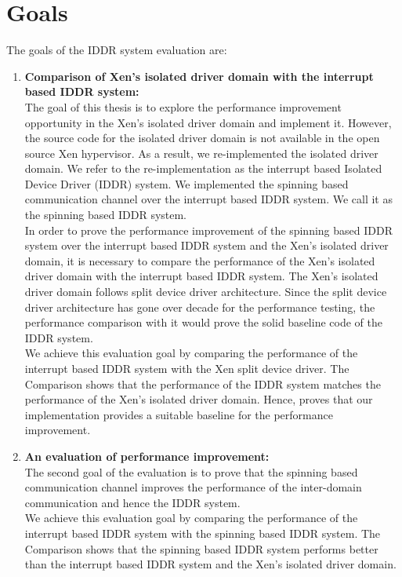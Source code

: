 \section{Goals}
\label{sec:goals}
The goals of the IDDR system evaluation are:
\begin{enumerate}
\item \textbf{Comparison  of Xen's isolated driver domain with the interrupt based IDDR system:}
\\[3mm]
The goal of this thesis is to explore the performance improvement opportunity in the Xen's isolated driver domain and implement it. However, the source code for the isolated driver domain is not available in the open source Xen hypervisor. As a result, we re-implemented the isolated driver domain. We refer to the re-implementation as the interrupt based Isolated Device Driver (IDDR) system. We implemented the spinning based communication channel over the interrupt based IDDR system. We call it as the spinning based IDDR system.
\\[3mm]
In order to prove the performance improvement of the spinning based IDDR system over the interrupt based IDDR system and the Xen's isolated driver domain, it is necessary to compare the performance of the Xen's isolated driver domain with the interrupt based IDDR system. The Xen's isolated driver domain follows split device driver architecture. Since the split device driver architecture has gone over decade for the performance testing, the performance comparison with it would prove the solid baseline code of the IDDR system. 
\\[3mm]
We achieve this evaluation goal by comparing the performance of the interrupt based IDDR system with the Xen split device driver. The Comparison  shows that the performance of the IDDR system matches the performance of the Xen's isolated driver domain. Hence, proves that our implementation provides a suitable baseline for the performance improvement.

\item \textbf{An evaluation of performance improvement:}
\\[3mm] 
The second goal of the evaluation is to prove that the spinning based communication channel improves the performance of the inter-domain communication and hence the IDDR system.
\\[3mm]
We achieve this evaluation goal by comparing the performance of the interrupt based IDDR system with the spinning based IDDR system. The Comparison  shows that the spinning based IDDR system performs better than the interrupt based IDDR system and the Xen's isolated driver domain.
\end{enumerate}

